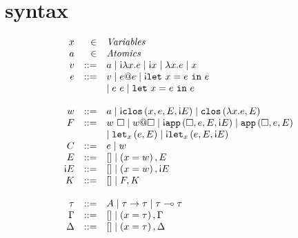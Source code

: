 \section{syntax}
\begin{center}
  \begin{minipage}{.6\textwidth}
    \[\begin{array}{rrl}
      x &\in& \mathit{Variables}\\
      a &\in& \mathit{Atomics}\\
      v &::=& a \mid \funA{x}{e} \mid \affsym x \mid \fun{x}{e} \mid x \\
      e &::=& v \mid e@e \mid \letA{x}{e}{e}\\
      &&\mid e\ e \mid \lett{x}{e}{e}\\
      &&\\
      w &::=& a \mid \closA{x}{e}{E}{\affE} \mid \clos{x}{e}{E}\\
      F &::=& w\ \square \mid w@\square \mid \appA{\square}{e}{E}{\affE} \mid \app{\square}{e}{E}\\
      &&\mid  \lets{x}{e}{E} \mid \letas{x}{e}{E}{\affE}\\
      C &::=& e \mid w\\
      E &::=& \left[\right] \mid \left(x = w\right), E\\
      \affE &::=& \left[\right] \mid \left(x = w\right), \affE\\
      K &::=& \left[\right] \mid F, K\\
      &&\\
      \tau &::=& A \mid \tau \rightarrow \tau \mid \tau \multimap \tau\\
      \Gamma &::=& \left[\right] \mid \left(x = \tau\right), \Gamma\\
      \Delta &::=& \left[\right] \mid \left(x = \tau\right), \Delta
    \end{array}\]
  \end{minipage}
\end{center}
